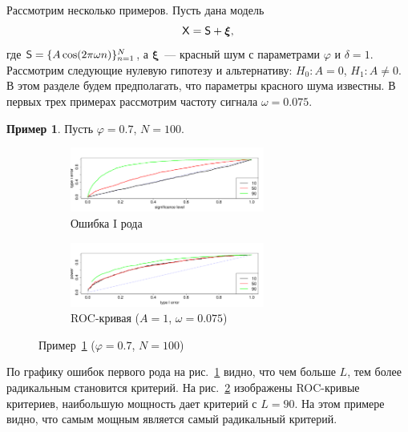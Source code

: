 \documentclass[specialist,
substylefile = spbu_report.rtx,
subf,href,colorlinks=true, 12pt]{disser}
\theoremstyle{definition}
\newtheorem{example}{Пример}
\begin{document}
Рассмотрим несколько примеров. Пусть дана модель
\[
    \mathsf{X}=\mathsf{S}+{\boldsymbol\xi},
\]
где $\mathsf{S}=\{A\cos(2\pi\omega n)\}_{n=1}^N$, а ${\boldsymbol\xi}$~--- красный шум с параметрами $\varphi$ и $\delta=1$. Рассмотрим следующие нулевую гипотезу и альтернативу: $H_0:A=0$, $H_1:A\ne0$. В этом разделе будем предполагать, что параметры красного шума известны. В первых трех примерах рассмотрим частоту сигнала $\omega = 0.075$.

\begin{example}\label{example1}
	Пусть $\varphi=0.7$, $N=100$.
	\begin{figure}[h!]
		\captionsetup[subfigure]{justification=Centering}
		\begin{subfigure}[t]{\textwidth}
			\centering
			\includegraphics[width=0.7\textwidth]{img/alphaI_phi7_N100}
			\caption{Ошибка I рода}
			\label{alphaI_phi7_N100}
		\end{subfigure}
		\begin{subfigure}[t]{\textwidth}
			\centering
			\includegraphics[width=0.7\textwidth]{img//roc_phi7_N100}
			\caption{ROC-кривая ($A=1$, $\omega=0.075$)}
			\label{roc_phi7_N100}
		\end{subfigure}
	\label{fig:example1}
	\caption{Пример~\ref{example1} ($\varphi=0.7$, $N=100$)}
	\end{figure}
	По графику ошибок первого рода на рис.~\ref{alphaI_phi7_N100} видно, что чем больше $L$, тем более радикальным становится критерий. На рис.~\ref{roc_phi7_N100} изображены ROC-кривые критериев, наибольшую мощность дает критерий с $L=90$. На этом примере видно, что самым мощным является самый радикальный критерий.
\end{example}
\end{document}
